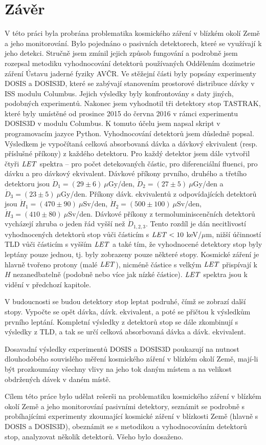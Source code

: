 \chapter*{Závěr}
V této práci byla probrána problematika kosmického záření v blízkém okolí Země a jeho monitorování. Bylo pojednáno o pasivních detektorech, které se využívají k jeho detekci. Stručně jsem zmínil jejich způsob fungování a podrobně jsem rozepsal metodiku vyhodnocování detektorů používaných Oddělením dozimetrie záření Ústavu jaderné fyziky AVČR. Ve stěžejní části byly popsány experimenty DOSIS a DOSIS3D, které se zabývají stanovením prostorové distribuce dávky v ISS modulu Columbus. Jejich výsledky byly konfrontovány s daty jiných, podobných experimentů. Nakonec jsem vyhodnotil tři detektory stop TASTRAK, které byly umístěné od prosince 2015 do června 2016 v rámci experimentu DOSIS3D v modulu Columbus. K tomuto účelu jsem napsal skript v programovacím jazyce Python.
Vyhodnocování detektorů jsem důsledně popsal. Výsledkem je vypočítaná celková absorbovaná dávka a dávkový ekvivalent (resp. příslušné příkony) z každého detektoru. Pro každý detektor
jsem dále vytvořil čtyři $\mathit{LET}$ spektra -- pro počet detekovaných částic, pro diferenciální fluenci, pro dávku a pro dávkový ekvivalent. Dávkové příkony prvního, druhého a třetího detektoru jsou $\dot{D}_1=(29\pm6)\ \mu$Gy/den, $\dot{D}_2=(27\pm5)\ \mu$Gy/den a $\dot{D}_3=(23\pm5)\ \mu$Gy/den. Příkony dávk. ekvivalentů z odpovídajících detektorů jsou $\dot{H}_1=(470\pm90)\ \mu$Sv/den, $\dot{H}_2=(500\pm100)\ \mu$Sv/den, $\dot{H}_3=(410\pm80)\ \mu$Sv/den. Dávkové příkony z termoluminiscenčních detektorů vycházejí zhruba o jeden řád vyšší než $\dot{D}_{1,2,3}$. Tento rozdíl je dán necitlivostí vyhodnocených detektorů stop vůči částicím s $\mathit{LET}<10$ keV/$\mu$m, nižší účinností TLD vůči částicím s vyšším $\mathit{LET}$ a také tím, že vyhodnocené detektory stop byly leptány pouze jednou, tj. byly zobrazeny pouze některé stopy. Kosmické záření je
hlavně tvořeno protony (malé $\mathit{LET}$), nicméně částice s velkým $\mathit{LET}$ přispívají k $H$ nezanedbatelně (podobně nebo více jak nízké částice). $\mathit{LET}$ spektra jsou k vidění v předchozí kapitole.

V budoucnosti se budou detektory stop leptat podruhé, čímž se zobrazí další stopy. Vypočte se opět dávka, dávk. ekvivalent, a poté se přičtou k výsledkům prvního leptání. Kompletní výsledky z detektorů stop se dále zkombinují s výsledky z TLD, a tak se určí celková absorbovaná dávka a dávk. ekvivalent. 

Dosavadní výsledky experimentů DOSIS a DOSIS3D poukazují na nutnost dlouhodobého souvislého měření kosmického záření v blízkém okolí Země, mají-li být prozkoumány všechny vlivy na jeho tok daným místem a na velikost obdržených dávek v daném místě.

Cílem této práce bylo udělat rešerši na problematiku kosmického záření v blízkém okolí Země a jeho monitorování pasivními detektory, seznámit se podrobně s probíhajícími experimenty zkoumající kosmické záření v blízkosti Země (hlavně s DOSIS a DOSIS3D), obeznámit se s metodikou a vyhodnocováním detektorů stop, analyzovat několik detektorů. Všeho bylo dosaženo. 
